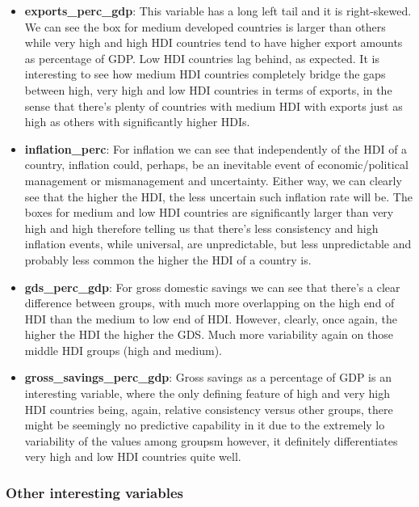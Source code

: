 \documentclass[]{article}
\providecommand{\tightlist}{%
  \setlength{\itemsep}{0pt}\setlength{\parskip}{0pt}}
\begin{document}
\begin{itemize}
\tightlist
\item
  \textbf{exports\_perc\_gdp}: This variable has a long left tail and it
  is right-skewed. We can see the box for medium developed countries is
  larger than others while very high and high HDI countries tend to have
  higher export amounts as percentage of GDP. Low HDI countries lag
  behind, as expected. It is interesting to see how medium HDI countries
  completely bridge the gaps between high, very high and low HDI
  countries in terms of exports, in the sense that there's plenty of
  countries with medium HDI with exports just as high as others with
  significantly higher HDIs.
\item
  \textbf{inflation\_perc}: For inflation we can see that independently
  of the HDI of a country, inflation could, perhaps, be an inevitable
  event of economic/political management or mismanagement and
  uncertainty. Either way, we can clearly see that the higher the HDI,
  the less uncertain such inflation rate will be. The boxes for medium
  and low HDI countries are significantly larger than very high and high
  therefore telling us that there's less consistency and high inflation
  events, while universal, are unpredictable, but less unpredictable and
  probably less common the higher the HDI of a country is.
\item
  \textbf{gds\_perc\_gdp}: For gross domestic savings we can see that
  there's a clear difference between groups, with much more overlapping
  on the high end of HDI than the medium to low end of HDI. However,
  clearly, once again, the higher the HDI the higher the GDS. Much more
  variability again on those middle HDI groups (high and medium).
\item
  \textbf{gross\_savings\_perc\_gdp}: Gross savings as a percentage of
  GDP is an interesting variable, where the only defining feature of
  high and very high HDI countries being, again, relative consistency
  versus other groups, there might be seemingly no predictive capability
  in it due to the extremely lo variability of the values among groupsm
  however, it definitely differentiates very high and low HDI countries
  quite well.
\end{itemize}

\hypertarget{other-interesting-variables}{%
\subsubsection{Other interesting
variables}\label{other-interesting-variables}}
\end{document}
